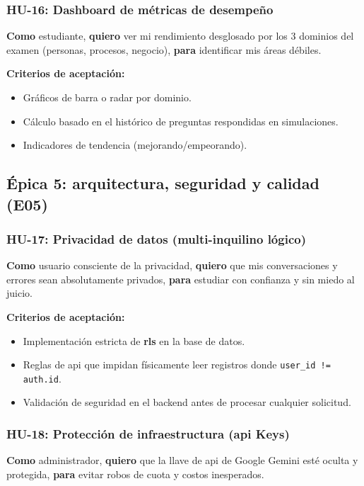 \subsubsection{HU-16: Dashboard de métricas de desempeño}
\textbf{Como} estudiante,
\textbf{quiero} ver mi rendimiento desglosado por los 3 dominios del examen (personas, procesos, negocio),
\textbf{para} identificar mis áreas débiles.

\textbf{Criterios de aceptación:}
\begin{itemize}
\item Gráficos de barra o radar por dominio.
\item Cálculo basado en el histórico de preguntas respondidas en simulaciones.
\item Indicadores de tendencia (mejorando/empeorando).
\end{itemize}

\subsection{Épica 5: arquitectura, seguridad y calidad (E05)}

\subsubsection{HU-17: Privacidad de datos (multi-inquilino lógico)}
\textbf{Como} usuario consciente de la privacidad,
\textbf{quiero} que mis conversaciones y errores sean absolutamente privados,
\textbf{para} estudiar con confianza y sin miedo al juicio.

\textbf{Criterios de aceptación:}
\begin{itemize}
\item Implementación estricta de \textbf{\gls{rls}} en la base de datos.
\item Reglas de \gls{api} que impidan físicamente leer registros donde \texttt{user\_id != auth.id}.
\item Validación de seguridad en el backend antes de procesar cualquier solicitud.
\end{itemize}

\subsubsection{HU-18: Protección de infraestructura (\gls{api} Keys)}
\textbf{Como} administrador,
\textbf{quiero} que la llave de \gls{api} de Google Gemini esté oculta y protegida,
\textbf{para} evitar robos de cuota y costos inesperados.

